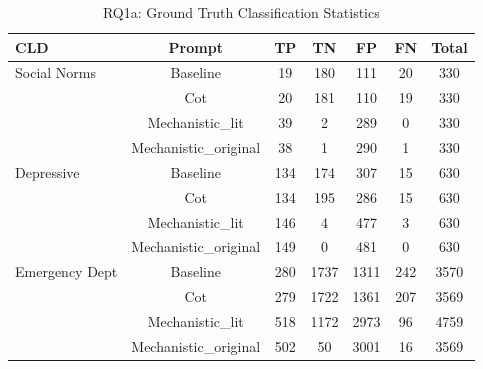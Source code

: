 \begin{table}[htbp]
\centreing
\caption{RQ1a: Ground Truth Classification Statistics}
\label{tab:rq1a_gt_classification}
\begin{tabular}{lcccccc}
\toprule
\textbf{CLD} & \textbf{Prompt} & \textbf{TP} & \textbf{TN} & \textbf{FP} & \textbf{FN} & \textbf{Total} \\
\midrule
Social Norms & Baseline & 19 & 180 & 111 & 20 & 330 \\
 & Cot & 20 & 181 & 110 & 19 & 330 \\
 & Mechanistic_lit & 39 & 2 & 289 & 0 & 330 \\
 & Mechanistic_original & 38 & 1 & 290 & 1 & 330 \\
\midrule
Depressive & Baseline & 134 & 174 & 307 & 15 & 630 \\
 & Cot & 134 & 195 & 286 & 15 & 630 \\
 & Mechanistic_lit & 146 & 4 & 477 & 3 & 630 \\
 & Mechanistic_original & 149 & 0 & 481 & 0 & 630 \\
\midrule
Emergency Dept & Baseline & 280 & 1737 & 1311 & 242 & 3570 \\
 & Cot & 279 & 1722 & 1361 & 207 & 3569 \\
 & Mechanistic_lit & 518 & 1172 & 2973 & 96 & 4759 \\
 & Mechanistic_original & 502 & 50 & 3001 & 16 & 3569 \\
\midrule
\bottomrule
\end{tabular}
\end{table}